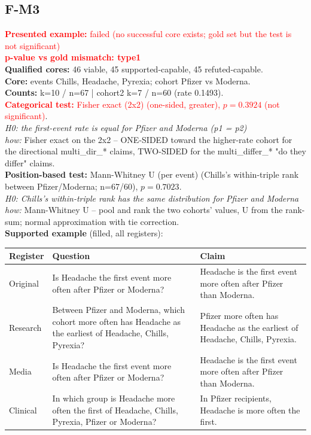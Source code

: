 \documentclass[11pt]{article}
\begin{document}
\subsection*{F-M3}
\textcolor{red}{\textbf{Presented example:} failed (no successful core exists; gold set but the test is not significant)} \\
\textcolor{red}{\textbf{p-value vs gold mismatch: type1}} \\
\textbf{Qualified cores:} 46 viable, 45 supported-capable, 45 refuted-capable. \\
\textbf{Core:} events Chills, Headache, Pyrexia; cohort Pfizer vs Moderna. \\
\textbf{Counts:} k=10 / n=67  |  cohort2 k=7 / n=60  (rate 0.1493). \\
\textcolor{red}{\textbf{Categorical test:} Fisher exact (2x2) (one-sided, greater), $p = 0.3924$ (not significant)}. \\
\emph{H0: the first-event rate is equal for Pfizer and Moderna (p1 = p2)} \\
\emph{how:} Fisher exact on the 2x2 -- ONE-SIDED toward the higher-rate cohort for the directional multi\_dir\_* claims, TWO-SIDED for the multi\_differ\_* "do they differ" claims. \\
\textbf{Position-based test:} Mann-Whitney U (per event) (Chills's within-triple rank between Pfizer/Moderna; n=67/60), $p = 0.7023$. \\
\emph{H0: Chills's within-triple rank has the same distribution for Pfizer and Moderna} \\
\emph{how:} Mann-Whitney U -- pool and rank the two cohorts' values, U from the rank-sum; normal approximation with tie correction. \\
\textbf{Supported example} (filled, all registers): \\
\begin{tabularx}{\linewidth}{@{}l L L@{}}
\toprule
\textbf{Register} & \textbf{Question} & \textbf{Claim} \\
\midrule
Original & Is Headache the first event more often after Pfizer or Moderna? & Headache is the first event more often after Pfizer than Moderna. \\
Research & Between Pfizer and Moderna, which cohort more often has Headache as the earliest of Headache, Chills, Pyrexia? & Pfizer more often has Headache as the earliest of Headache, Chills, Pyrexia. \\
Media & Is Headache the first event more often after Pfizer or Moderna? & Headache is the first event more often after Pfizer than Moderna. \\
Clinical & In which group is Headache more often the first of Headache, Chills, Pyrexia, Pfizer or Moderna? & In Pfizer recipients, Headache is more often the first. \\
\bottomrule
\end{tabularx}
\end{document}

